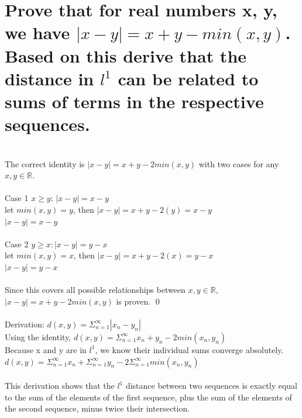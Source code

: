 \documentclass{article}
\begin{document}
\section{Prove that for real numbers x, y, we have $|x-y| = x + y - min(x,y)$.  Based on this derive that the distance in 
$l^1$ can be related to sums of terms in the respective sequences.}
\\
The correct identity is $|x-y| = x+y-2min(x,y)$ with two cases for any $x,y \in \mathbb{R}$.
\\
\\
Case 1 $x \geq y$: $|x-y| = x-y$
\\
let $min(x,y) = y$, then $|x-y| = x+y - 2(y) = x-y$
\\
$|x-y| = x-y$ \checkmark
\\
\\
Case 2 $y \geq x: |x-y| = y-x$
\\
let $min(x,y) = x$, then $|x-y| = x+y-2(x) = y-x$
\\
$|x-y| = y-x$ \checkmark
\\
\\
Since this covers all possible relationships between $x,y \in \mathbb{R}, $$|x-y| = x+y-2min(x,y)$ is proven. \qed
\\
\\
Derivation:
$d(x,y) = \Sigma_{n=1}^\infty|x_n-y_n|$
\\
Using the identity, $d(x,y) = \Sigma_{n=1}^\infty x_n+y_n-2min(x_n,y_n)$
\\
Because x and y are in $l^1$, we know their individual sums converge absolutely.  $d(x,y) = \Sigma_{n=1}^\infty x_n + \Sigma_{n=1}^\infty y_n-2\Sigma_{n=1}^\infty min(x_n,y_n)$
\\
\\
This derivation shows that the $l^1$ distance between two sequences is exactly equal to the sum of the elements of the first sequence, plus the sum of the elements of the second sequence, minus twice their intersection.
\end{document}
